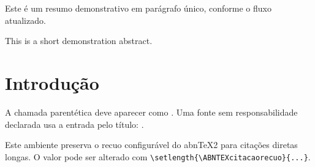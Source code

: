 \documentclass[article,11pt,oneside,a4paper,brazilian]{abntex2}
\begin{document}
\maketitle

\begin{resumoumacoluna}
Este é um resumo demonstrativo em parágrafo único, conforme o fluxo atualizado.
\end{resumoumacoluna}

\renewcommand{\resumoname}{Abstract}
\begin{resumoumacoluna}
This is a short demonstration abstract.
\end{resumoumacoluna}

\textual
\section{Introdução}

A chamada parentética deve aparecer como \parencite{silva2024}. Uma fonte sem
responsabilidade declarada usa a entrada pelo título: \parencite{anteprojeto1987}.

\begin{citacao}
Este ambiente preserva o recuo configurável do abnTeX2 para citações diretas
longas. O valor pode ser alterado com \verb|\setlength{\ABNTEXcitacaorecuo}{...}|.
\end{citacao}

\postextual
\printbibliography
\end{document}
